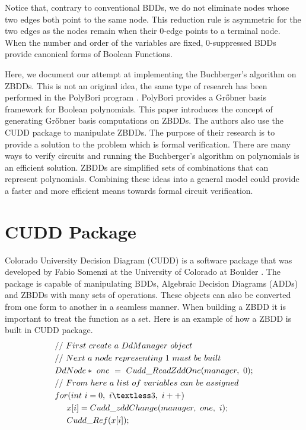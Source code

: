 \documentclass[letterpaper, 10 pt, conference]{ieeeconf}
\begin{document}
Notice that, contrary to conventional BDDs, we do not eliminate nodes whose two edges both point to the same node. This reduction rule is asymmetric for the two edges as the nodes remain when their 0-edge points to a terminal node. When the number and order of the variables are fixed, 0-suppressed BDDs provide canonical forms of Boolean Functions.

Here, we document our attempt at implementing the Buchberger's algorithm on ZBDDs.  This is not an original idea, the same type of research has been performed in the PolyBori program \cite{brickenstein2009polybori}.  PolyBori provides a Gr{\H o}bner basis framework for Boolean polynomials. This paper introduces the concept of generating Gr{\H o}bner basis computations on ZBDDs.  The authors also use the CUDD package to manipulate ZBDDs.  The purpose of their research is to provide a solution to the problem which is formal verification.  There are many ways to verify circuits and running the Buchberger's algorithm on polynomials is an efficient solution.  ZBDDs are simplified sets of combinations that can represent polynomials.  Combining these ideas into a general model could provide a faster and more efficient means towards formal circuit verification.
\section{CUDD Package}
\label{sec:cudd}

Colorado University Decision Diagram (CUDD) is a software package that was developed by Fabio Somenzi at the University of Colorado at Boulder \cite{somenzi1998cudd}.  The package is capable of manipulating BDDs, Algebraic Decision Diagrams (ADDs) and ZBDDs with many sets of operations.  These objects can also be converted from one form to another in a seamless manner.  When building a ZBDD it is important to treat the function as a set.  Here is an example of how a ZBDD is built in CUDD package.
\begin{align*}
&//\ First\ create\ a\ DdManager\ object \\
&//\ Next\ a\ node\ representing\ 1\ must\ be\ built \\
&DdNode*\ one\ =\ Cudd\_ReadZddOne(manager,\ 0); \\
&//\ From\ here\ a\ list\ of\ variables\ can\ be\ assigned \\		
&for(int\ i = 0,\ i\textless 3,\ i++) \\
&\hspace{5mm}x[i] = Cudd\_zddChange(manager,\ one,\ i); \\ 
&\hspace{5mm}Cudd\_Ref(x[i]); \\
\end{align*}	 
\end{document}
